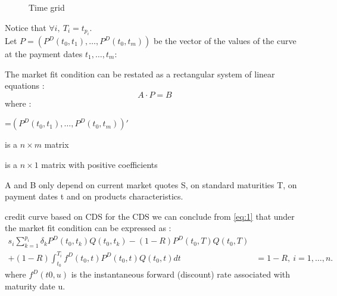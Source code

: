 \begin{figure}[H]
  \centering
  \caption{Time grid }
  \label{fig:3}
\end{figure}

Notice that $\forall i, \ T_i=t_{p_i}$.\\


Let $P=(P^D(t_0,t_1),\dots,P^D(t_0,t_m))$  be the  vector of  the values  of the
curve at the payment dates $t_1,\dots,t_m$:

The  market fit  condition can  be restated  as a  rectangular system  of linear
equations :
\[
A \cdot P=B
\]
where :
\begin{description}
\item[P] =$(P^D(t_0,t_1),\dots,P^D(t_0,t_m))'$ 
\item[A] is a $n \times m$ matrix
\item[B] is a $n \times 1$ matrix with positive coefficients
\item A and B only depend on current market quotes S, on standard maturities T, on payment dates t and on products characteristics.
\end{description}

\begin{example}{credit curve based on CDS}
  for  the  CDS we  can  conclude  from \ref{eq:1}  that  under  the market  fit
  condition can be expressed as :
  \begin{eqnarray*}
    \label{eq:2}
    s_i\sum^{p_i}_{k=1}\delta_kP^D(t_0,t_k)Q(t_0,t_k)        -       (1        -
    R)P^D(t_0,T)Q(t_0,T) & \\
    + (1 - R)\int^{T_i}_{t_0}f^D(t_0,t)P^D(t_0,t)Q(t_0,t)dt & = 1 - R,\ i=1,\dots,n.
  \end{eqnarray*}
  where $f^D(t0, u)$ is the instantaneous forward (discount) rate associated with
  maturity date u.
\end{example}

